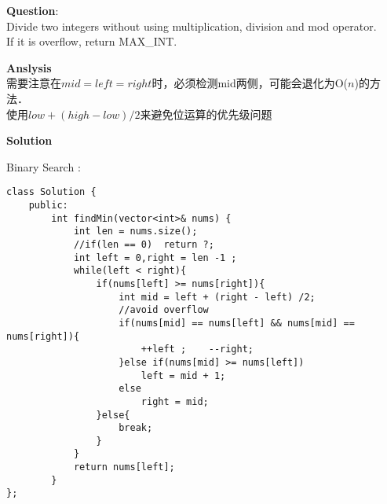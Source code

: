     
\begin{description}
    \item{\textbf{Question}}:\\%
		Divide two integers without using multiplication, division and mod operator.\\
		If it is overflow, return MAX\_INT.\\

    \item{\textbf{Anslysis}}\\
		需要注意在$mid=left=right$时，必须检测mid两侧，可能会退化为O($n$)的方法．\\
		使用$low + (high - low)/2$来避免位运算的优先级问题\\

    \item{\textbf{Solution}}\\
	\item{Binary Search} : \\
		\begin{lstlisting}
class Solution {
	public:
		int findMin(vector<int>& nums) {
			int len = nums.size();
			//if(len == 0)	return ?;
			int left = 0,right = len -1 ;
			while(left < right){
				if(nums[left] >= nums[right]){
					int mid = left + (right - left) /2;
					//avoid overflow
					if(nums[mid] == nums[left] && nums[mid] == nums[right]){
						++left ;	--right;
					}else if(nums[mid] >= nums[left])
						left = mid + 1;
					else
						right = mid;
				}else{
					break;
				}
			}
			return nums[left];
		}
};
		\end{lstlisting}
\end{description}

